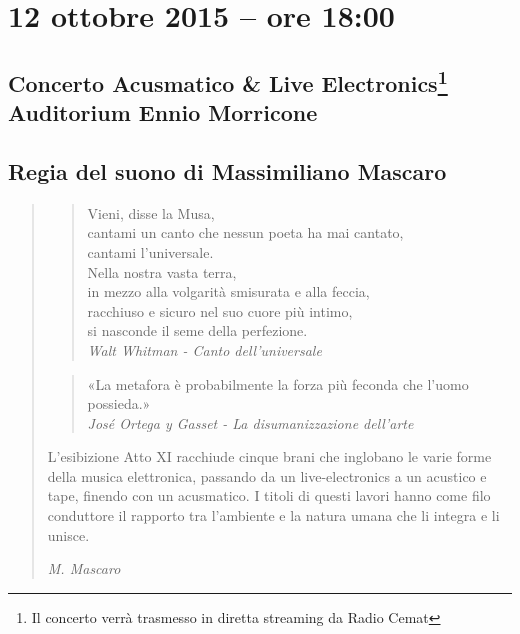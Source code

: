 \documentclass[8pt, twoside, a5paper]{extreport}
\begin{document}
\bigskip

\begin{multicols}{2}




\end{multicols}

\clearpage

\section*{12 ottobre 2015 -- ore 18:00}

\subsection*{{\small Concerto Acusmatico \& Live Electronics\footnote{ Il concerto verrà trasmesso in diretta streaming da Radio Cemat}} \\
	\textsf{Auditorium Ennio Morricone}}

{\fontsize{30}{30} }

\subsection*{\textsf{Regia del suono di Massimiliano Mascaro}}

\begin{quote}

{\svolk \small
\begin{quote}Vieni, disse la Musa,\\
cantami un canto che nessun poeta ha mai cantato,\\
cantami l'universale.\\
Nella nostra vasta terra,\\
in mezzo alla volgarità smisurata e alla feccia,\\
racchiuso e sicuro nel suo cuore più intimo,\\
si nasconde il seme della perfezione.\\
\hspace{1mm}\emph{Walt Whitman - Canto dell'universale}
\end{quote}

\begin{quote}«La metafora è probabilmente la forza più feconda che l'uomo possieda.»\\
\hspace{1mm}\emph{Jos\'e Ortega y  Gasset - La disumanizzazione dell'arte}
\end{quote}

L'esibizione Atto XI racchiude cinque brani che inglobano le varie forme della musica elettronica, passando da un live-electronics a un acustico e tape, finendo con un acusmatico. I titoli di questi lavori hanno come filo conduttore il rapporto tra l'ambiente e la natura umana che li integra e li unisce.}

\emph{M. Mascaro}
\end{quote}    
\end{document}
